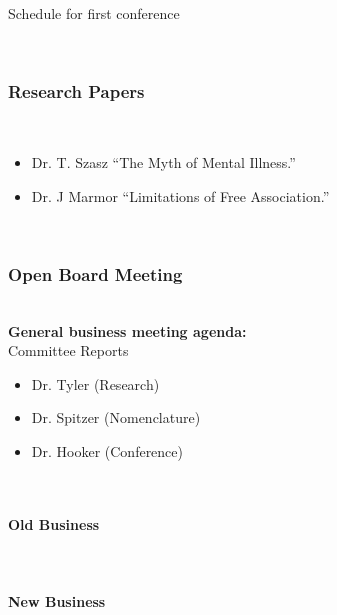 \begin{refsection}
\begin{apatextbox}{Schedule for first conference}
\begin{enumerate}
\end{enumerate}

\\

\subsubsection{Research Papers}
\label{researchpapers}

\\

\begin{itemize}
\item Dr. T. Szasz “The Myth of Mental Illness.”

\item Dr. J Marmor “Limitations of Free Association.”

\end{itemize}

\\

\subsubsection{Open Board Meeting}
\label{openboardmeeting}

\\

\textbf{General business meeting agenda:} \\

Committee Reports \\

\begin{itemize}
\item Dr. Tyler (Research)

\item Dr. Spitzer (Nomenclature)

\item Dr. Hooker (Conference)

\end{itemize}

\\

\paragraph{Old Business}
\label{oldbusiness}

\\

\paragraph{New Business}
\label{newbusiness}


\end{apatextbox}
\end{refsection}
